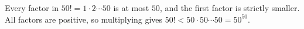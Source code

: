 Every factor in $ 50!=1\cdot2\cdots50 $ is at most $ 50 $, and the first factor is strictly smaller. All factors are positive, so multiplying gives $ 50!<50\cdot50\cdots50=50^{50}$.
